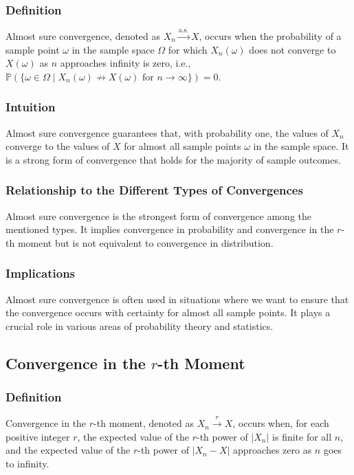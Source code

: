 \documentclass{article}
\begin{document}
\subsubsection{Definition}
Almost sure convergence, denoted as \(X_n \xrightarrow{\text{a.s.}} X\), occurs when the probability of a sample point \(\omega\) in the sample space \(\Omega\) for which \(X_n(\omega)\) does not converge to \(X(\omega)\) as \(n\) approaches infinity is zero, i.e., \(\mathbb{P}(\{\omega \in \Omega \mid X_n(\omega) \not\rightarrow X(\omega) \text{ for } n \rightarrow \infty\}) = 0\).

\subsubsection{ Intuition}
Almost sure convergence guarantees that, with probability one, the values of \(X_n\) converge to the values of \(X\) for almost all sample points \(\omega\) in the sample space. It is a strong form of convergence that holds for the majority of sample outcomes.

\subsubsection{ Relationship to the Different Types of Convergences}
Almost sure convergence is the strongest form of convergence among the mentioned types. It implies convergence in probability and convergence in the \(r\)-th moment but is not equivalent to convergence in distribution.

\subsubsection{ Implications}
Almost sure convergence is often used in situations where we want to ensure that the convergence occurs with certainty for almost all sample points. It plays a crucial role in various areas of probability theory and statistics.

\subsection{Convergence in the \(r\)-th Moment}

\subsubsection{ Definition}
Convergence in the \(r\)-th moment, denoted as \(X_n \xrightarrow{r} X\), occurs when, for each positive integer \(r\), the expected value of the \(r\)-th power of \(|X_n|\) is finite for all \(n\), and the expected value of the \(r\)-th power of \(|X_n - X|\) approaches zero as \(n\) goes to infinity.
\end{document}
